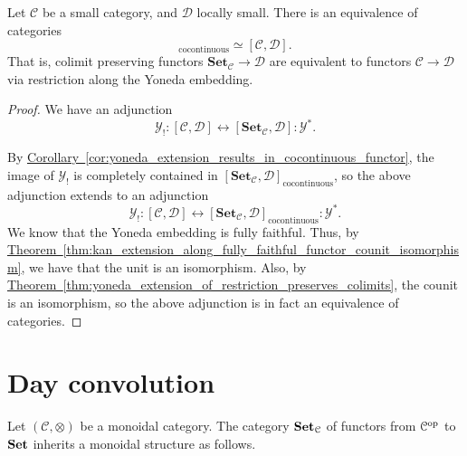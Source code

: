 \documentclass[main.tex]{subfiles}
\begin{document}
\begin{corollary}
  \label{cor:functors_equivalent_to_cocontinuous_functors_out_of_presheafs}
  Let $\mathcal{C}$ be a small category, and $\mathcal{D}$ locally small. There is an equivalence of categories
  \begin{equation*}
    [\mathbf{Set}_{\mathcal{C}} , \mathcal{D}]_{\mathrm{cocontinuous}} \simeq [\mathcal{C}, \mathcal{D}].
  \end{equation*}
  That is, colimit preserving functors $\mathbf{Set}_{\mathcal{C}}  \to \mathcal{D}$ are equivalent to functors $\mathcal{C} \to \mathcal{D}$ via restriction along the Yoneda embedding.
\end{corollary}
\begin{proof}
  We have an adjunction
  \begin{equation*}
    \mathcal{Y}_{!}: [\mathcal{C}, \mathcal{D}] \leftrightarrow [\mathbf{Set}_{\mathcal{C}} , \mathcal{D}] : \mathcal{Y}^{*}.
  \end{equation*}

  By \hyperref[cor:yoneda_extension_results_in_cocontinuous_functor]{Corollary~\ref*{cor:yoneda_extension_results_in_cocontinuous_functor}}, the image of $\mathcal{Y}_{!}$ is completely contained in $[\mathbf{Set}_{\mathcal{C}} , \mathcal{D}]_{\mathrm{cocontinuous}}$, so the above adjunction extends to an adjunction
  \begin{equation*}
    \mathcal{Y}_{!}: [\mathcal{C}, \mathcal{D}] \leftrightarrow [\mathbf{Set}_{\mathcal{C}} , \mathcal{D}]_{\mathrm{cocontinuous}} : \mathcal{Y}^{*}.
  \end{equation*}
  We know that the Yoneda embedding is fully faithful. Thus, by \hyperref[thm:kan_extension_along_fully_faithful_functor_counit_isomorphism]{Theorem~\ref*{thm:kan_extension_along_fully_faithful_functor_counit_isomorphism}}, we have that the unit is an isomorphism. Also, by \hyperref[thm:yoneda_extension_of_restriction_preserves_colimits]{Theorem~\ref*{thm:yoneda_extension_of_restriction_preserves_colimits}}, the counit is an isomorphism, so the above adjunction is in fact an equivalence of categories.
\end{proof}

\section{Day convolution}
\label{sec:day_convolution}

Let $(\mathcal{C}, \otimes)$ be a monoidal category. The category $\mathbf{Set}_{\mathcal{C}}$ of functors from $\mathcal{C}^{\mathrm{op}}$ to $\mathbf{Set}$ inherits a monoidal structure as follows.
\end{document}
